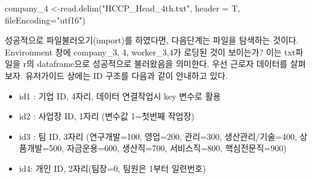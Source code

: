 \documentclass[
]{book}
\newenvironment{Shaded}{\begin{snugshade}}{\end{snugshade}}
\newcommand{\AttributeTok}[1]{\textcolor[rgb]{0.77,0.63,0.00}{#1}}
\newcommand{\FunctionTok}[1]{\textcolor[rgb]{0.00,0.00,0.00}{#1}}
\newcommand{\NormalTok}[1]{#1}
\newcommand{\OtherTok}[1]{\textcolor[rgb]{0.56,0.35,0.01}{#1}}
\newcommand{\StringTok}[1]{\textcolor[rgb]{0.31,0.60,0.02}{#1}}
\providecommand{\tightlist}{%
  \setlength{\itemsep}{0pt}\setlength{\parskip}{0pt}}
\theoremstyle{definition}
\theoremstyle{definition}
\theoremstyle{definition}
\theoremstyle{definition}
\theoremstyle{remark}
\begin{document}
\begin{Shaded}
\begin{Highlighting}[]
\NormalTok{company\_4 }\OtherTok{\textless{}{-}}\FunctionTok{read.delim}\NormalTok{(}\StringTok{"HCCP\_Head\_4th.txt"}\NormalTok{, }\AttributeTok{header =}\NormalTok{ T, }\AttributeTok{fileEncoding=}\StringTok{"utf16"}\NormalTok{)}
\end{Highlighting}
\end{Shaded}

성공적으로 파일불러오기(import)를 하였다면, 다음단계는 파일을 탐색하는 것이다. Environment 창에 company\_3, 4, worker\_3,4가 로딩된 것이 보이는가? 이는 txt파일을 r의 dataframe으로 성공적으로 불러왔음을 의미한다. 우선 근로자 데이터를 살펴보자. 유저가이드 상에는 ID 구조를 다음과 같이 안내하고 있다.

\begin{itemize}
\tightlist
\item
  id1 : 기업 ID, 4자리, 데이터 연결작업시 key 변수로 활용
\item
  id2 : 사업장 ID, 1자리 (변수값 1=첫번째 작업장)
\item
  id3 : 팀 ID, 3자리 (연구개발=100, 영업=200, 관리=300, 생산관리/기술=400, 상품개발=500, 자금운용=600, 생산직=700, 서비스직=800, 핵심전문직=900)
\item
  id4: 개인 ID, 2자리(팀장=0, 팀원은 1부터 일련번호)
\end{itemize}
\end{document}
